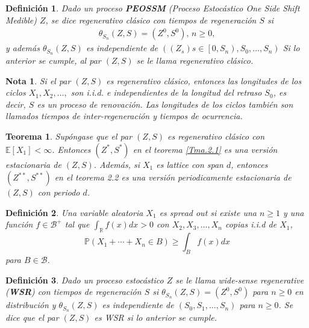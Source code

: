 \documentclass{article}
\newtheorem{Def}{Definición}[section]
\newtheorem{Teo}{Teorema}%
\newtheorem{Note}{Nota}%
\newcommand{\rea}{\mathbb{R}}
\newcommand{\esp}{\mathbb{E}}
\newcommand{\prob}{\mathbb{P}}
\numberwithin{equation}{section}
\begin{document}
\begin{Def}
Dado un proceso \textbf{PEOSSM} (Proceso Estoc\'astico One Side Shift Medible) $Z$, se dice regenerativo cl\'asico con tiempos de regeneraci\'on $S$ si 
\begin{eqnarray*}
\theta_{S_{n}}\left(Z,S\right)=\left(Z^{0},S^{0}\right)\textrm{, }n\geq0,
\end{eqnarray*}
y adem\'as $\theta_{S_{n}}\left(Z,S\right)$ es independiente de $\left(\left(Z_{s}\right)s\in\left[0,S_{n}\right),S_{0},\ldots,S_{n}\right)$
Si lo anterior se cumple, al par $\left(Z,S\right)$ se le llama regenerativo cl\'asico.
\end{Def}

\begin{Note}
Si el par $\left(Z,S\right)$ es regenerativo cl\'asico, entonces las longitudes de los ciclos $X_{1},X_{2},\ldots,$ son i.i.d. e independientes de la longitud del retraso $S_{0}$, es decir, $S$ es un proceso de renovaci\'on. Las longitudes de los ciclos tambi\'en son llamados tiempos de inter-regeneraci\'on y tiempos de ocurrencia.
\end{Note}

\begin{Teo}\label{Tma.Reg.Clasico}
Sup\'ongase que el par $\left(Z,S\right)$ es regenerativo cl\'asico con $\esp\left[X_{1}\right]<\infty$. Entonces $\left(Z^{*},S^{*}\right)$ en el teorema \ref{Tma.2.1} es una versi\'on estacionaria de $\left(Z,S\right)$. Adem\'as, si $X_{1}$ es lattice con span $d$, entonces $\left(Z^{**},S^{**}\right)$ en el teorema 2.2 es una versi\'on periodicamente estacionaria de $\left(Z,S\right)$ con periodo $d$.

\end{Teo}

\begin{Def}
Una variable aleatoria $X_{1}$ es \textit{spread out} si existe una $n\geq1$ y una  funci\'on $f\in\mathcal{B}^{+}$ tal que $\int_{\rea}f\left(x\right)dx>0$ con $X_{2},X_{3},\ldots,X_{n}$ copias i.i.d  de $X_{1}$, $$\prob\left(X_{1}+\cdots+X_{n}\in B\right)\geq\int_{B}f\left(x\right)dx$$ para $B\in\mathcal{B}$.
\end{Def}

\begin{Def}
Dado un proceso estoc\'astico $Z$ se le llama \textit{wide-sense regenerative} (\textbf{WSR}) con tiempos de regeneraci\'on $S$ si $\theta_{S_{n}}\left(Z,S\right)=\left(Z^{0},S^{0}\right)$ para $n\geq0$ en distribuci\'on y $\theta_{S_{n}}\left(Z,S\right)$ es independiente de $\left(S_{0},S_{1},\ldots,S_{n}\right)$ para $n\geq0$.
Se dice que el par $\left(Z,S\right)$ es WSR si lo anterior se cumple.
\end{Def}
\end{document}
